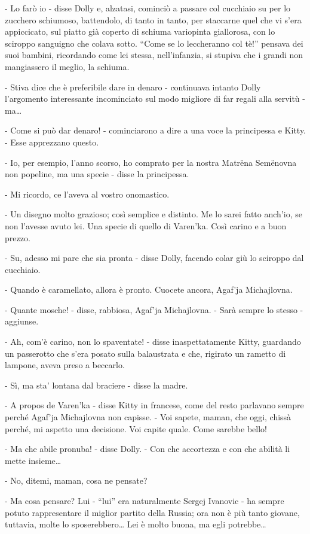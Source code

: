 - Lo farò io - disse Dolly e, alzatasi, cominciò a passare col cucchiaio su per lo zucchero schiumoso, battendolo, di tanto in tanto, per staccarne quel che vi s'era appiccicato, sul piatto già coperto di schiuma variopinta giallorosa, con lo sciroppo sanguigno che colava sotto. ``Come se lo leccheranno col tè!'' pensava dei suoi bambini, ricordando come lei stessa, nell'infanzia, si stupiva che i grandi non mangiassero il meglio, la schiuma. 

- Stiva dice che è preferibile dare in denaro - continuava intanto Dolly l'argomento interessante incominciato sul modo migliore di far regali alla servitù - ma\ldots{} 

- Come si può dar denaro! - cominciarono a dire a una voce la principessa e Kitty. - Esse apprezzano questo. 

- Io, per esempio, l'anno scorso, ho comprato per la nostra Matrëna Semënovna non popeline, ma una specie - disse la principessa. 

- Mi ricordo, ce l'aveva al vostro onomastico. 

- Un disegno molto grazioso; così semplice e distinto. Me lo sarei fatto anch'io, se non l'avesse avuto lei. Una specie di quello di Varen'ka. Così carino e a buon prezzo. 

- Su, adesso mi pare che sia pronta - disse Dolly, facendo colar giù lo sciroppo dal cucchiaio. 

- Quando è caramellato, allora è pronto. Cuocete ancora, Agaf'ja Michajlovna. 

- Quante mosche! - disse, rabbiosa, Agaf'ja Michajlovna. - Sarà sempre lo stesso - aggiunse. 

- Ah, com'è carino, non lo spaventate! - disse inaspettatamente Kitty, guardando un passerotto che s'era posato sulla balaustrata e che, rigirato un rametto di lampone, aveva preso a beccarlo. 

- Sì, ma sta' lontana dal braciere - disse la madre. 

- A propos de Varen'ka - disse Kitty in francese, come del resto parlavano sempre perché Agaf'ja Michajlovna non capisse. - Voi sapete, maman, che oggi, chissà perché, mi aspetto una decisione. Voi capite quale. Come sarebbe bello! 

- Ma che abile pronuba! - disse Dolly. - Con che accortezza e con che abilità li mette insieme\ldots{} 

- No, ditemi, maman, cosa ne pensate? 

- Ma cosa pensare? Lui - ``lui'' era naturalmente Sergej Ivanovic - ha sempre potuto rappresentare il miglior partito della Russia; ora non è più tanto giovane, tuttavia, molte lo sposerebbero\ldots{} Lei è molto buona, ma egli potrebbe\ldots{} 

